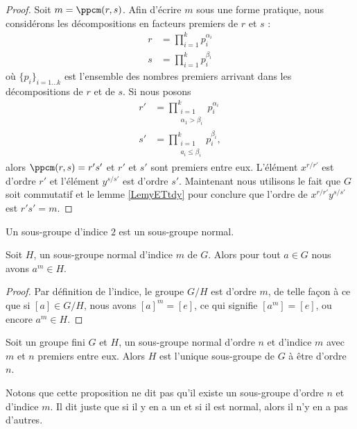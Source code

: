 \begin{proof}
    Soit \( m=\ppcm(r,s)\). Afin d'écrire \( m\) sous une forme pratique, nous considérons les décompositions en facteurs premiers de \( r\) et \( s\) :
    \begin{subequations}
        \begin{align}
            r&=\prod_{i=1}^kp_i^{\alpha_i}\\
            s&=\prod_{i=1}^kp_i^{\beta_i}
        \end{align}
    \end{subequations}
    où \( \{ p_i \}_{i=1\ldots k}\) est l'ensemble des nombres premiers arrivant dans les décompositions de \( r\) et de \( s\). Si nous posons
    \begin{subequations}
        \begin{align}
            r'&=\prod_{\substack{i=1\\\alpha_1>\beta_i}}^kp_i^{\alpha_i}\\
            s'&=\prod_{\substack{i=1\\a_i\leq \beta_i}}^kp_i^{\beta_i},
        \end{align}
    \end{subequations}
    alors \( \ppcm(r,s)=r's'\) et \( r'\) et \( s'\) sont premiers entre eux. L'élément \( x^{r/r'}\) est d'ordre \( r'\) et l'élément \( y^{s/s'}\) est d'ordre \( s'\). Maintenant nous utilisons le fait que \( G\) soit commutatif et le lemme \ref{LemyETtdy} pour conclure que l'ordre de \( x^{r/r'}y^{s/s'}\) est \( r's'=m\).
\end{proof}

\begin{lemma}    \label{LemSkIOOG}
    Un sous-groupe d'indice \( 2\) est un sous-groupe normal.
\end{lemma}

\begin{lemma}\label{PropubeiGX}
    Soit \( H\), un sous-groupe normal d'indice \( m\) de \( G\). Alors pour tout \( a\in G\) nous avons \( a^m\in H\).
\end{lemma}

\begin{proof}
    Par définition de l'indice, le groupe \( G/H\) est d'ordre \( m\), de telle façon à ce que si \( [a]\in G/H\), nous avons \( [a]^m=[e]\), ce qui signifie \( [a^m]=[e]\), ou encore \( a^m\in H\).
\end{proof}

\begin{proposition}
    Soit un groupe fini \( G\) et \( H\), un sous-groupe normal d'ordre \( n\) et d'indice \( m\) avec \( m\) et \( n\) premiers entre eux. Alors \( H\) est l'unique sous-groupe de \( G\) à être d'ordre \( n\).
\end{proposition}
Notons que cette proposition ne dit pas qu'il existe un sous-groupe d'ordre \( n\) et d'indice \( m\). Il dit juste que si il y en a un et si il est normal, alors il n'y en a pas d'autres.

